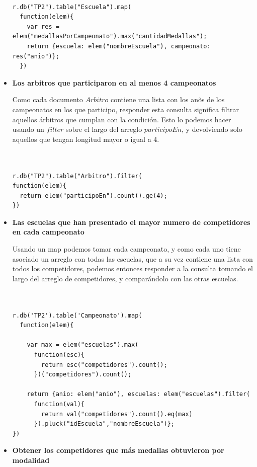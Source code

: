 \begin{itemize}
{\begin{verbatim}

r.db("TP2").table("Escuela").map(
  function(elem){
    var res = elem("medallasPorCampeonato").max("cantidadMedallas");
    return {escuela: elem("nombreEscuela"), campeonato: res("anio")};
  })

\end{verbatim}
}

\item{\textbf{Los arbitros que participaron en al menos 4 campeonatos}

Como cada documento $Arbitro$ contiene una lista con los an\~os de los campeonatos en los que participo, responder esta consulta significa filtrar aquellos árbitros que cumplan con la condición. Esto lo podemos hacer usando un $filter$ sobre el largo del arreglo $participoEn$, y devolviendo solo aquellos que tengan longitud mayor o igual a 4. 

\begin{verbatim}


r.db("TP2").table("Arbitro").filter(
function(elem){
  return elem("participoEn").count().ge(4);
})

\end{verbatim}
}

\item{\textbf{Las escuelas que han presentado el mayor numero de competidores en cada campeonato}

Usando un map podemos tomar cada campeonato, y como cada uno tiene asociado un arreglo con todas las escuelas, que a su vez contiene una lista con todos los competidores, podemos entonces responder a la consulta tomando el largo del arreglo de competidores, y comparándolo con las otras escuelas.

\begin{verbatim}


r.db('TP2').table('Campeonato').map(
  function(elem){

    var max = elem("escuelas").max(
      function(esc){
        return esc("competidores").count();
      })("competidores").count();
    
    return {anio: elem("anio"), escuelas: elem("escuelas").filter(
      function(val){
      	return val("competidores").count().eq(max)
      }).pluck("idEscuela","nombreEscuela")};
})

\end{verbatim}
}


\item{\textbf{Obtener los competidores que m\'as medallas obtuvieron por modalidad}



}
\end{itemize}
